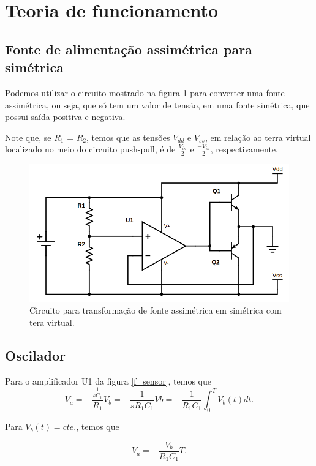 \newpage
\section{Teoria de funcionamento}

\subsection{Fonte de alimentação assimétrica para simétrica}
Podemos utilizar o circuito mostrado na figura \ref{f_fonte} para converter uma fonte assimétrica, ou seja, que só tem um valor de tensão, em uma fonte simétrica, que possui saída positiva e negativa.

Note que, se $R_1$ = $R_2$, temos que as tensões $V_{dd}$ e $V_{ss}$, em relação ao terra virtual localizado no meio do circuito push-pull, é de $\frac{V_{in}}{2}$ e $\frac{-V_{in}}{2}$, respectivamente.

\begin{figure}[H]
    \centering
    \includegraphics[scale=0.5]{img/fonte.png}
    \caption{Circuito para transformação de fonte assimétrica em simétrica com tera virtual.}
    \label{f_fonte}
\end{figure}

\subsection{Oscilador}
Para o amplificador U1 da figura \ref{f_sensor}, temos que 
\[
V_a = -\frac{\frac{1}{sC_1}}{R_1}V_b = -\frac{1}{sR_1C_1}Vb = -\frac{1}{R_1C_1} \int_{0}^{T}V_b(t)dt.
\]

Para $V_b(t) = cte.$, temos que 

\begin{equation}
V_a = -\frac{V_b}{R_1C_1}T.
\label{e_va}  
\end{equation}

